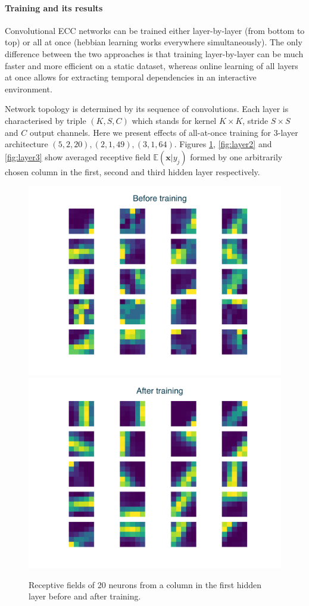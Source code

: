 \documentclass[12pt]{article}
\begin{document}
\paragraph{Training and its results}  Convolutional ECC networks can be trained either layer-by-layer (from bottom to top) or all at once (hebbian learning works everywhere simultaneously). The only difference between the two approaches is that training layer-by-layer can be much faster and more efficient on a static dataset, whereas online learning of all layers at once allows for extracting temporal dependencies in an interactive environment. 

Network topology is determined by its sequence of convolutions. Each layer is characterised by triple $(K, S, C)$ which stands for kernel $K \times K$, stride $S \times S$ and $C$ output channels. Here we present effects of all-at-once training for 3-layer architecture $(5,2,20) ,(2,1,49),  (3,1 ,64)$. Figures  \ref{fig:layer1},  \ref{fig:layer2} and  \ref{fig:layer3} show averaged receptive field $\mathbb{E}(\boldsymbol{x}|y_j)$ formed by one arbitrarily chosen column in the first, second and third hidden layer respectively.


\begin{figure}[!htbp]
	\centering
	\includegraphics[width=12cm]{k5s2c1d1_c20 machine before}
	\includegraphics[width=12cm]{k5s2c1d1_c20 machine after}
	\caption{Receptive fields of 20 neurons from a column in the first hidden layer before and after training.}
	\label{fig:layer1}
\end{figure} 
\end{document}
